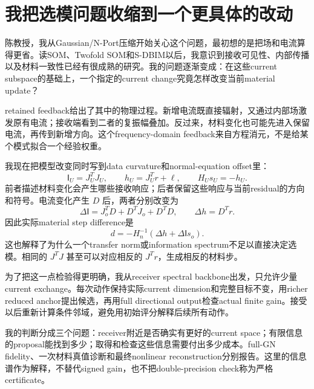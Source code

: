 \section{我把选模问题收缩到一个更具体的改动}
陈教授，我从Gaussian/N-Port压缩开始关心这个问题，最初想的是把场和电流算得更省。读SOM、Twofold SOM和S-DBIM以后，我意识到接收可见性、内部传播以及材料一致性已经有很成熟的研究。我的问题逐渐变成：在这些current subspace的基础上，一个指定的current change究竟怎样改变当前material update？

retained feedback给出了其中的物理过程。新增电流既直接辐射，又通过内部场激发原有电流；接收端看到二者的复振幅叠加。反过来，材料变化也可能先进入保留电流，再传到新增方向。这个frequency-domain feedback来自方程消元，不是给某个模式拟合一个经验权重。

我现在把模型改变同时写到data curvature和normal-equation offset里：
\[
 \mathsf I_U=J_U^TJ_U,\qquad h_U=J_U^Tr+\ell,
 \qquad H_Us_U=-h_U.
\]
前者描述材料变化会产生哪些接收响应；后者保留这些响应与当前residual的方向和符号。电流变化产生 $D$ 后，两者分别改变为
\[
 \Delta\mathsf I=J_o^TD+D^TJ_o+D^TD,
 \qquad\Delta h=D^Tr.
\]
因此实际material step difference是
\[
 d=-H_n^{-1}(\Delta h+\Delta\mathsf I s_o).
\]
这也解释了为什么一个transfer norm或information spectrum不足以直接决定选模。相同的 $J^TJ$ 甚至可以对应相反的 $J^Tr$，生成相反的材料步。

为了把这一点检验得更明确，我从receiver spectral backbone出发，只允许少量current exchange。每次动作保持实际current dimension和完整目标不变，用richer reduced anchor提出候选，再用full directional output检查actual finite gain。接受以后重新计算条件邻域，避免用初始评分解释后续所有动作。

我的判断分成三个问题：receiver附近是否确实有更好的current space；有限信息的proposal能找到多少；取得和检查这些信息需要付出多少成本。full-GN fidelity、一次材料真值诊断和最终nonlinear reconstruction分别报告。这里的信息谱作为解释，不替代signed gain，也不把double-precision check称为严格certificate。
